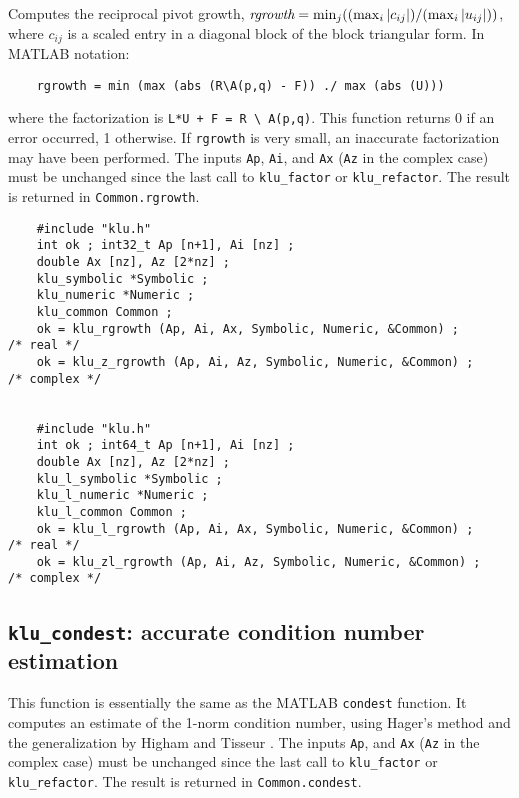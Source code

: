 \documentclass[11pt]{article}
\begin{document}
Computes the reciprocal pivot growth,
$\mbox{\em rgrowth} = \min_j (( \max_i |c_{ij}| ) / ( \max_i |u_{ij}| ))$,
where $c_{ij}$ is a scaled entry in a diagonal block of the block triangular
form.  In MATLAB notation:
\begin{verbatim}
    rgrowth = min (max (abs (R\A(p,q) - F)) ./ max (abs (U)))
\end{verbatim}
where the factorization is \verb'L*U + F = R \ A(p,q)'.
This function returns 0 if an error occurred, 1 otherwise.  If {\tt rgrowth} is
very small, an inaccurate factorization may have been performed.  The inputs
{\tt Ap}, {\tt Ai}, and {\tt Ax}  ({\tt Az} in the complex case) must be
unchanged since the last call to {\tt klu\_factor} or {\tt klu\_refactor}.  The
result is returned in {\tt Common.rgrowth}.

{\footnotesize
\begin{verbatim}
    #include "klu.h"
    int ok ; int32_t Ap [n+1], Ai [nz] ;
    double Ax [nz], Az [2*nz] ;
    klu_symbolic *Symbolic ;
    klu_numeric *Numeric ;
    klu_common Common ;
    ok = klu_rgrowth (Ap, Ai, Ax, Symbolic, Numeric, &Common) ;                       /* real */
    ok = klu_z_rgrowth (Ap, Ai, Az, Symbolic, Numeric, &Common) ;                     /* complex */


    #include "klu.h"
    int ok ; int64_t Ap [n+1], Ai [nz] ;
    double Ax [nz], Az [2*nz] ;
    klu_l_symbolic *Symbolic ;
    klu_l_numeric *Numeric ;
    klu_l_common Common ;
    ok = klu_l_rgrowth (Ap, Ai, Ax, Symbolic, Numeric, &Common) ;                     /* real */
    ok = klu_zl_rgrowth (Ap, Ai, Az, Symbolic, Numeric, &Common) ;                    /* complex */
\end{verbatim}
}

\subsection{{\tt klu\_condest}: accurate condition number estimation}

This function is essentially the same as the MATLAB {\tt condest} function.  It
computes an estimate of the 1-norm condition number, using Hager's method
\cite{Hager84} and the generalization by Higham and Tisseur
\cite{HighamTisseur00}.  The inputs {\tt Ap}, and {\tt Ax} ({\tt Az} in the
complex case) must be unchanged since the last call to {\tt klu\_factor} or
{\tt klu\_refactor}.  The result is returned in {\tt Common.condest}.
\end{document}
